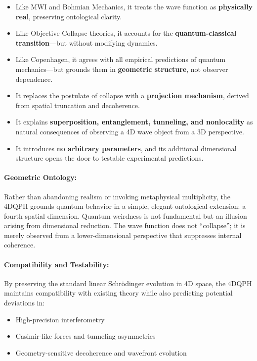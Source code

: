 \documentclass[12pt]{article}
\begin{document}
\begin{itemize}
    \item Like MWI and Bohmian Mechanics, it treats the wave function as \textbf{physically real}, preserving ontological clarity.
    \item Like Objective Collapse theories, it accounts for the \textbf{quantum-classical transition}—but without modifying dynamics.
    \item Like Copenhagen, it agrees with all empirical predictions of quantum mechanics—but grounds them in \textbf{geometric structure}, not observer dependence.
    \item It replaces the postulate of collapse with a \textbf{projection mechanism}, derived from spatial truncation and decoherence.
    \item It explains \textbf{superposition, entanglement, tunneling, and nonlocality} as natural consequences of observing a 4D wave object from a 3D perspective.
    \item It introduces \textbf{no arbitrary parameters}, and its additional dimensional structure opens the door to testable experimental predictions.
\end{itemize}

\paragraph{Geometric Ontology:}  
Rather than abandoning realism or invoking metaphysical multiplicity, the 4DQPH grounds quantum behavior in a simple, elegant ontological extension: a fourth spatial dimension. Quantum weirdness is not fundamental but an illusion arising from dimensional reduction. The wave function does not “collapse”; it is merely observed from a lower-dimensional perspective that suppresses internal coherence.

\paragraph{Compatibility and Testability:}  
By preserving the standard linear Schrödinger evolution in 4D space, the 4DQPH maintains compatibility with existing theory while also predicting potential deviations in:

\begin{itemize}
    \item High-precision interferometry
    \item Casimir-like forces and tunneling asymmetries
    \item Geometry-sensitive decoherence and wavefront evolution
\end{itemize}
\end{document}
